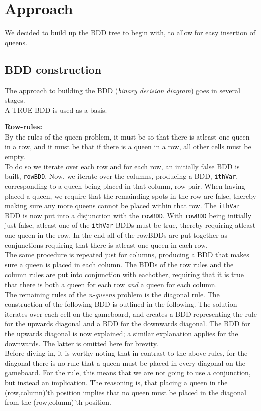\section{Approach}
We decided to build up the BDD tree to begin with, to allow for easy insertion of queens.

\subsection{BDD construction}
The approach to building the BDD (\textit{binary decision diagram}) goes in several stages.\\
A TRUE-BDD is used as a basis. 

\textbf{Row-rules:}\\
By the rules of the queen problem, it must be so that there is atleast one queen in a row, and it must be that if there is a queen in a row, all other cells must be empty.\\
To do so we iterate over each row and for each row, an initially false BDD is built, \texttt{rowBDD}. Now, we iterate over the columns, producing a BDD, \texttt{ithVar}, corresponding to a queen being placed in that column, row pair. When having placed a queen, we require that the remainding spots in the row are false, thereby making sure any more queens cannot be placed within that row. The \texttt{ithVar} BDD is now put into a disjunction with the \texttt{rowBDD}.  With \texttt{rowBDD} being initially just false, atleast one of the \texttt{ithVar} BDDs must be true, thereby requiring atleast one queen in the row. In the end all of the rowBDDs are put together as conjunctions requiring that there is atleast one queen in each row.\\

The same procedure is repeated just for columns, producing a BDD that makes sure a queen is placed in each column. The BDDs of the row rules and the column rules are put into conjunction with eachother, requiring that it is true that there is both a queen for each row \textit{and} a queen for each column. \\

The remaining rules of the \textit{n-queens} problem is the diagonal rule. The construction of the following BDD is outlined in the following. 
The solution iterates over each cell on the gameboard, and creates a BDD representing the rule for the upwards diagonal and a BDD for the downwards diagonal. The BDD for the upwards diagonal is now explained; a similar explanation applies for the downwards. The latter is omitted here for brevity.\\
Before diving in, it is worthy noting that in contrast to the above rules, for the diagonal there is no rule that a queen must be placed in every diagonal on the gameboard. For the rule, this means that we are not going to use a conjunction, but instead an implication. The reasoning is, that placing a queen in the (row,column)'th position implies that no queen must be placed in the diagonal from the (row,column)'th position. \\

